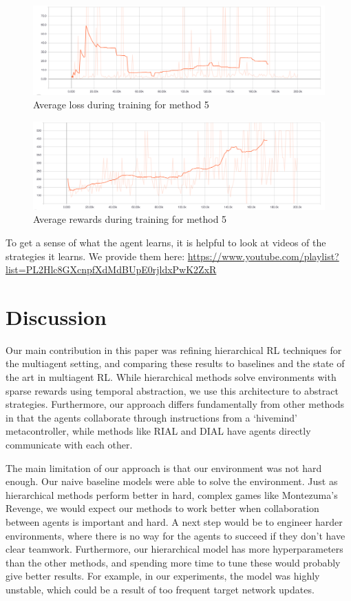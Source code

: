 \documentclass{article}
\begin{document}
\begin{figure}[H]
\centering
\includegraphics[scale=0.17]{better_baseline_loss.png}
\caption{Average loss during training for method 5}
\end{figure}

\begin{figure}[H]
\centering
\includegraphics[scale=0.17]{better_baseline_reward.png}
\caption{Average rewards during training for method 5}
\end{figure}

To get a sense of what the agent learns, it is helpful to look at videos of the
strategies it learns. We provide them here:
\url{https://www.youtube.com/playlist?list=PL2Hlc8GXcnpfXdMdBUpE0rjldxPwK2ZxR}


\section{Discussion}

Our main contribution in this paper was refining hierarchical RL techniques \cite{kulkarni2016hierarchical} for the multiagent setting, and comparing these results to baselines and the state of the art in multiagent RL. While hierarchical methods solve environments with sparse rewards using temporal abstraction, we use this architecture to abstract strategies. Furthermore, our approach differs fundamentally from other methods in that the agents collaborate through instructions from a `hivemind' metacontroller, while methods like RIAL and DIAL
\cite{foerster2016learning} have agents directly communicate with each other. 

The main limitation of our approach is that our environment was not hard enough. Our naive baseline models were able to solve the environment. Just as hierarchical methods perform better in hard, complex games like Montezuma's Revenge, we would expect our methods to work better when collaboration between agents is important and hard. A next step would be to engineer harder environments, where there is no way for the agents to succeed if they don't have clear teamwork. Furthermore, our hierarchical model has more hyperparameters than the other methods, and spending more time to tune these would probably give better results. For example, in our experiments, the model was highly unstable, which could be a result of too frequent target network updates.



\end{document}
